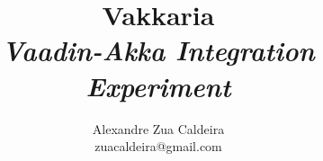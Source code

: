 
\title{Vakkaria\\\emph{Vaadin-Akka Integration Experiment}}

\author{Alexandre Zua Caldeira\\zuacaldeira@gmail.com}








